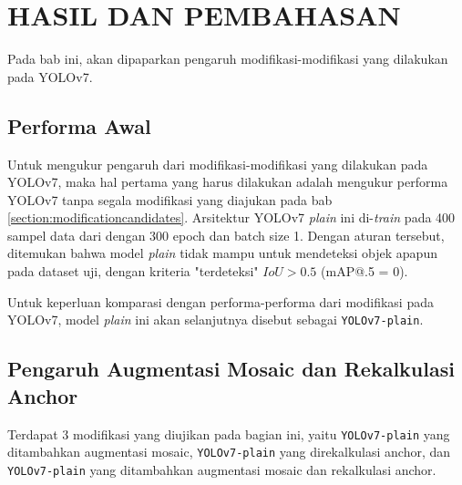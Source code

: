 \chapter{HASIL DAN PEMBAHASAN}


Pada bab ini, akan dipaparkan pengaruh modifikasi-modifikasi yang dilakukan pada YOLOv7.

\section{Performa Awal}
Untuk mengukur pengaruh dari modifikasi-modifikasi yang dilakukan pada YOLOv7, maka
hal pertama yang harus dilakukan adalah mengukur performa YOLOv7 tanpa segala modifikasi
yang diajukan pada bab \ref{section:modificationcandidates}. Arsitektur YOLOv7 \emph{plain} 
ini di-\emph{train} pada 400 sampel data dari  \textcite{aot_dataset} dengan 300 epoch dan batch size 1.
Dengan aturan tersebut, ditemukan bahwa model \emph{plain} tidak mampu untuk mendeteksi
objek apapun pada dataset uji, dengan kriteria "terdeteksi" $IoU > 0.5$ (mAP@.5 = 0).

Untuk keperluan komparasi dengan performa-performa dari modifikasi pada YOLOv7,
model \emph{plain} ini akan selanjutnya disebut sebagai \verb*|YOLOv7-plain|.

\section{Pengaruh Augmentasi Mosaic dan Rekalkulasi Anchor}


Terdapat 3 modifikasi yang diujikan pada bagian ini, yaitu \verb*|YOLOv7-plain| yang ditambahkan augmentasi mosaic,
\verb*|YOLOv7-plain| yang direkalkulasi anchor, dan \verb*|YOLOv7-plain| yang ditambahkan augmentasi mosaic dan rekalkulasi anchor.
